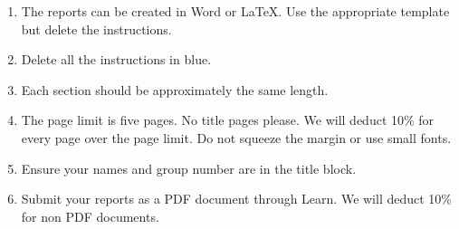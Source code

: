 \documentclass[a4paper,12pt]{article}
\begin{document}
\begin{enumerate}
\item The reports can be created in Word or \LaTeX.  Use the
  appropriate template but delete the instructions.

\item Delete all the instructions in blue.  

\item Each section should be approximately the same length.

\item The page limit is five pages.  No title pages please.  We will
  deduct 10\% for every page over the page limit.  Do not squeeze the
  margin or use small fonts.

\item Ensure your names and group number are in the title block.

\item Submit your reports as a PDF document through Learn.  We will
  deduct 10\% for non PDF documents.
\end{enumerate}
\end{document}
